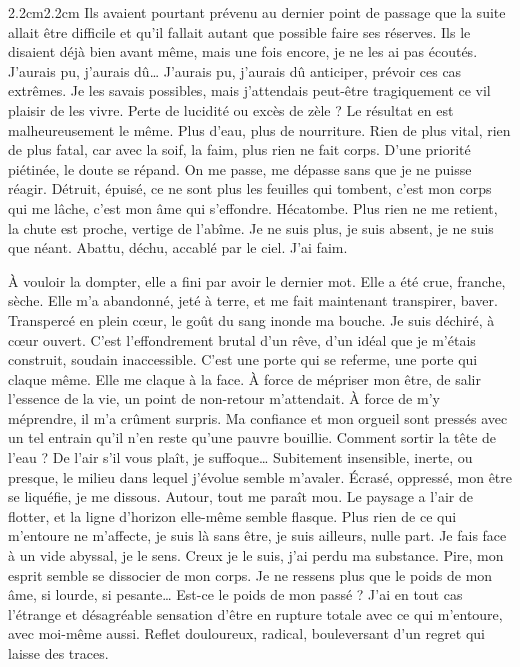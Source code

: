 \begin{adjustwidth}{2.2cm}{2.2cm}
Ils avaient pourtant prévenu au dernier point de passage que la suite allait être difficile et qu’il fallait autant que possible faire ses réserves. Ils le disaient déjà bien avant même, mais une fois encore, je ne les ai pas écoutés. J’aurais pu, j’aurais dû… J’aurais pu, j’aurais dû anticiper, prévoir ces cas extrêmes. Je les savais possibles, mais j’attendais peut-être tragiquement ce vil plaisir de les vivre. Perte de lucidité ou excès de zèle ? Le résultat en est malheureusement le même. Plus d’eau, plus de nourriture. Rien de plus vital, rien de plus fatal, car avec la soif, la faim, plus rien ne fait corps. D’une priorité piétinée, le doute se répand. On me passe, me dépasse sans que je ne puisse réagir. Détruit, épuisé, ce ne sont plus les feuilles qui tombent, c’est mon corps qui me lâche, c’est mon âme qui s’effondre. Hécatombe. Plus rien ne me retient, la chute est proche, vertige de l’abîme. Je ne suis plus, je suis absent, je ne suis que néant. Abattu, déchu, accablé par le ciel. J’ai faim.

À vouloir la dompter, elle a fini par avoir le dernier mot. Elle a été crue, franche, sèche. Elle m’a abandonné, jeté à terre, et me fait maintenant transpirer, baver. Transpercé en plein cœur, le goût du sang inonde ma bouche. Je suis déchiré, à cœur ouvert. C’est l’effondrement brutal d’un rêve, d’un idéal que je m’étais construit, soudain inaccessible. C’est une porte qui se referme, une porte qui claque même. Elle me claque à la face. À force de mépriser mon être, de salir l’essence de la vie, un point de non-retour m’attendait. À force de m’y méprendre, il m’a crûment surpris. Ma confiance et mon orgueil sont pressés avec un tel entrain qu’il n’en reste qu’une pauvre bouillie. Comment sortir la tête de l’eau ? De l’air s’il vous plaît, je suffoque…
Subitement insensible, inerte, ou presque, le milieu dans lequel j’évolue semble m’avaler. Écrasé, oppressé, mon être se liquéfie, je me dissous. Autour, tout me paraît mou. Le paysage a l’air de flotter, et la ligne d’horizon elle-même semble flasque. Plus rien de ce qui m’entoure ne m’affecte, je suis là sans être, je suis ailleurs, nulle part. Je fais face à un vide abyssal, je le sens. Creux je le suis, j’ai perdu ma substance. Pire, mon esprit semble se dissocier de mon corps. Je ne ressens plus que le poids de mon âme, si lourde, si pesante… Est-ce le poids de mon passé ? J’ai en tout cas l’étrange et désagréable sensation d’être en rupture totale avec ce qui m’entoure, avec moi-même aussi. Reflet douloureux, radical, bouleversant d’un regret qui laisse des traces.


\end{adjustwidth}
